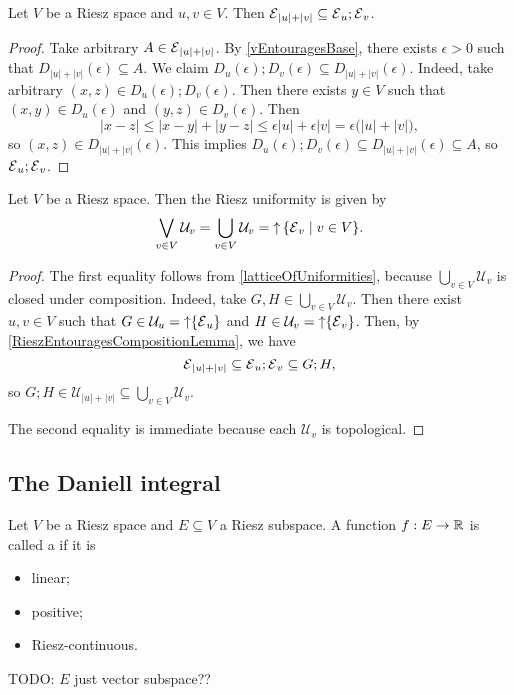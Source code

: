 \begin{lemma} \label{RieszEntouragesCompositionLemma}
Let $V$ be a Riesz space and $u,v\in V$. Then $\operatorname{\mathcal{E}}_{|u|+|v|} \subseteq \operatorname{\mathcal{E}}_{u};\operatorname{\mathcal{E}}_{v}$.
\end{lemma}
\begin{proof}
Take arbitrary $A\in \operatorname{\mathcal{E}}_{|u|+|v|}$. By \ref{vEntouragesBase}, there exists $\epsilon > 0$ such that $D_{|u|+|v|}(\epsilon) \subseteq A$. We claim $D_{u}(\epsilon);D_{v}(\epsilon) \subseteq D_{|u|+|v|}(\epsilon)$. Indeed, take arbitrary $(x,z) \in D_{u}(\epsilon);D_{v}(\epsilon)$. Then there exists $y\in V$ such that $(x,y)\in D_{u}(\epsilon)$ and $(y,z)\in D_{v}(\epsilon)$. Then
\[ |x-z| \leq |x-y|+ |y-z| \leq \epsilon |u| + \epsilon |v| = \epsilon\big(|u|+|v|\big), \]
so $(x,z) \in D_{|u|+|v|}(\epsilon)$. This implies $D_{u}(\epsilon);D_{v}(\epsilon) \subseteq D_{|u|+|v|}(\epsilon) \subseteq A$, so $\operatorname{\mathcal{E}}_{u};\operatorname{\mathcal{E}}_{v}$.
\end{proof}

\begin{proposition}
Let $V$ be a Riesz space. Then the Riesz uniformity is given by
\[ \bigvee_{v\in V} \mathcal{U}_v = \bigcup_{v\in V} \mathcal{U}_v = \upset \setbuilder{\entourages_v}{v\in V}. \]
\end{proposition}
\begin{proof}
The first equality follows from \ref{latticeOfUniformities}, because $\bigcup_{v\in V} \mathcal{U}_v$ is closed under composition. Indeed, take $G,H\in \bigcup_{v\in V} \mathcal{U}_v$. Then there exist $u,v\in V$ such that $G \in\mathcal{U}_u = \operatorname{\uparrow} \{\operatorname{\mathcal{E}}_u\}$ and $H \in\mathcal{U}_v = \operatorname{\uparrow} \{\operatorname{\mathcal{E}}_v\}$. Then, by \ref{RieszEntouragesCompositionLemma}, we have
\[ \operatorname{\mathcal{E}}_{|u|+|v|} \subseteq \operatorname{\mathcal{E}}_{u};\operatorname{\mathcal{E}}_{v} \subseteq G;H, \]
so $G;H\in \mathcal{U}_{|u|+|v|} \subseteq \bigcup_{v\in V} \mathcal{U}_v$.

The second equality is immediate because each $\mathcal{U}_v$ is topological.
\end{proof}


\subsection{The Daniell integral}
\begin{definition}
Let $V$ be a Riesz space and $E\subseteq V$ a Riesz subspace. A function $f: E\to \mathbb{R}$ is called a  if it is
\begin{itemize}
\item linear;
\item positive;
\item Riesz-continuous.
\end{itemize}
\end{definition}
TODO: $E$ just vector subspace??

